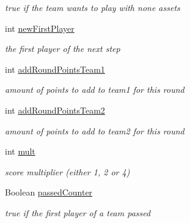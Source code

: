 \begin{DoxyCompactItemize}
\begin{DoxyCompactList}\small\item\em true if the team wants to play with none assets \end{DoxyCompactList}\item 
int \hyperlink{class_coinche_1_1_tools_1_1_game_info_aa9b6fbfb2ff2fa1eca132a8309f49035}{new\+First\+Player}
\begin{DoxyCompactList}\small\item\em the first player of the next step \end{DoxyCompactList}\item 
int \hyperlink{class_coinche_1_1_tools_1_1_game_info_aed3eb9ce4d7328b7db337cc90b48d672}{add\+Round\+Points\+Team1}
\begin{DoxyCompactList}\small\item\em amount of points to add to team1 for this round \end{DoxyCompactList}\item 
int \hyperlink{class_coinche_1_1_tools_1_1_game_info_a80a720cfab6611699cd8b7160bb02e7b}{add\+Round\+Points\+Team2}
\begin{DoxyCompactList}\small\item\em amount of points to add to team2 for this round \end{DoxyCompactList}\item 
int \hyperlink{class_coinche_1_1_tools_1_1_game_info_a847381ba8a7e85cd6201ad6d1e3eea12}{mult}
\begin{DoxyCompactList}\small\item\em score multiplier (either 1, 2 or 4) \end{DoxyCompactList}\item 
Boolean \hyperlink{class_coinche_1_1_tools_1_1_game_info_aa340d1c2fea40ca6867671a67f8574f8}{passed\+Counter}
\begin{DoxyCompactList}\small\item\em true if the first player of a team passed \end{DoxyCompactList}\item 

\end{DoxyCompactItemize}
